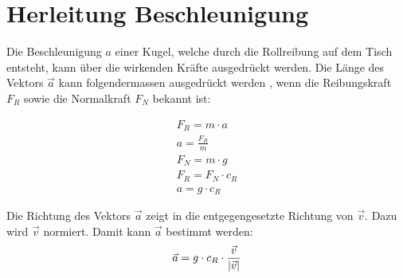 \section{Herleitung Beschleunigung}\label{anhang:herleitung:beschleunigung}
Die Beschleunigung $a$ einer Kugel, welche durch die Rollreibung auf dem Tisch entsteht,
kann über die wirkenden Kräfte ausgedrückt werden.
Die Länge des Vektors $\vec{a}$ kann folgendermassen ausgedrückt werden \cite{wiki.rollreibung:1},
wenn die Reibungskraft $F_R$ sowie die Normalkraft $F_N$ bekannt ist:

\begin{align}
    F_R = m \cdot a\\
    a = \frac{F_R}{m}\\
    F_N = m \cdot g\\
    F_R = F_N \cdot c_R\\
    a = g \cdot c_R
\end{align}

Die Richtung des Vektors $\vec{a}$ zeigt in die entgegengesetzte Richtung von $\vec{v}$.
Dazu wird $\vec{v}$ normiert. Damit kann $\vec{a}$ bestimmt werden:
\begin{align}
    \vec{a} = g \cdot c_R \cdot \frac{\vec{v}}{\lvert \vec{v} \rvert}
\end{align}
